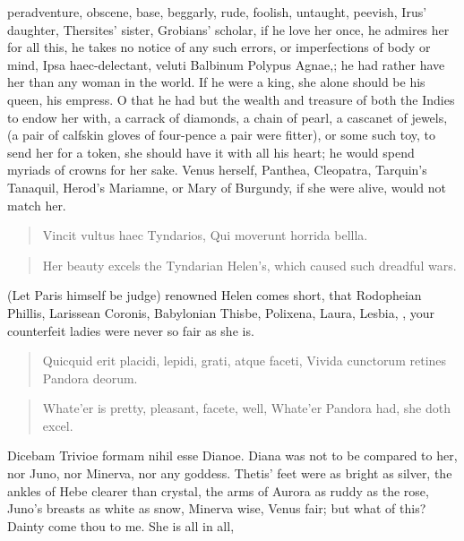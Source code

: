 peradventure, obscene, base, beggarly, rude, foolish, untaught,
peevish, Irus' daughter, Thersites' sister, Grobians' scholar, if he
love her once, he admires her for all this, he takes no notice of any
such errors, or imperfections of body or mind, Ipsa
haec-delectant, veluti Balbinum Polypus Agnae,; he had rather have her
than any woman in the world. If he were a king, she alone should be his
queen, his empress. O that he had but the wealth and treasure of both
the Indies to endow her with, a carrack of diamonds, a chain of pearl,
a cascanet of jewels, (a pair of calfskin gloves of four-pence a pair
were fitter), or some such toy, to send her for a token, she should
have it with all his heart; he would spend myriads of crowns for her
sake. Venus herself, Panthea, Cleopatra, Tarquin's Tanaquil, Herod's
Mariamne, or Mary of Burgundy, if she were alive, would not match
her.

\begin{latin}
\begin{verse}
Vincit vultus haec Tyndarios,
Qui moverunt horrida bellla.
\end{verse}
\end{latin}
\translationrule%
\begin{verse}%
Her beauty excels the Tyndarian Helen's,
which caused such dreadful wars.
\end{verse}%

(Let Paris himself be judge) renowned Helen comes short, that Rodopheian
Phillis, Larissean Coronis, Babylonian Thisbe, Polixena, Laura, Lesbia,
\etc{}, your counterfeit ladies were never so fair as she is.

\begin{latin}
\begin{verse}
Quicquid erit placidi, lepidi, grati, atque faceti,
Vivida cunctorum retines Pandora deorum.
\end{verse}
\end{latin}
\translationrule%
\begin{verse}%
Whate'er is pretty, pleasant, facete, well,
Whate'er Pandora had, she doth excel.
\end{verse}%

Dicebam Trivioe formam nihil esse Dianoe. Diana was not to be
compared to her, nor Juno, nor Minerva, nor any goddess. Thetis' feet
were as bright as silver, the ankles of Hebe clearer than crystal, the
arms of Aurora as ruddy as the rose, Juno's breasts as white as snow,
Minerva wise, Venus fair; but what of this? Dainty come thou to me. She
is all in all,

